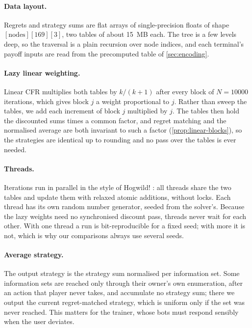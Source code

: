 \paragraph{Data layout.} Regrets and strategy sums are flat arrays of single-precision floats of shape $[\text{nodes}][169][3]$, two tables of about \SI{15}{MB} each. The tree is a few levels deep, so the traversal is a plain recursion over node indices, and each terminal's payoff inputs are read from the precomputed table of \cref{sec:encoding}.

\paragraph{Lazy linear weighting.} Linear CFR multiplies both tables by $k/(k+1)$ after every block of $N = \num{10000}$ iterations, which gives block $j$ a weight proportional to $j$. Rather than sweep the tables, we add each increment of block $j$ multiplied by $j$. The tables then hold the discounted sums times a common factor, and regret matching and the normalised average are both invariant to such a factor (\cref{prop:linear-blocks}), so the strategies are identical up to rounding and no pass over the tables is ever needed.

\paragraph{Threads.} Iterations run in parallel in the style of Hogwild! \cite{recht2011}: all threads share the two tables and update them with relaxed atomic additions, without locks. Each thread has its own random number generator, seeded from the solver's. Because the lazy weights need no synchronised discount pass, threads never wait for each other. With one thread a run is bit-reproducible for a fixed seed; with more it is not, which is why our comparisons always use several seeds.

\paragraph{Average strategy.} The output strategy is the strategy sum normalised per information set. Some information sets are reached only through their owner's own enumeration, after an action that player never takes, and accumulate no strategy sum; there we output the current regret-matched strategy, which is uniform only if the set was never reached. This matters for the trainer, whose bots must respond sensibly when the user deviates.

